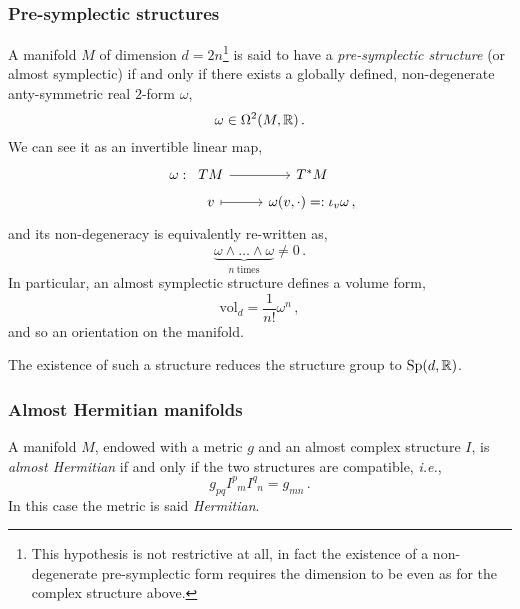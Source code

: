 \documentclass[debug]{phd}
\begin{document}
					\subsubsection{Pre-symplectic structures}
						A manifold $M$ of dimension $d = 2n$\footnote{%
							This hypothesis is not restrictive at all, in fact the existence of a non-degenerate pre-symplectic form requires the dimension to be even as for the complex structure above.%
								}
						is said to have a \emph{pre-symplectic structure} (or almost symplectic) if and only if there exists a globally defined, non-degenerate anty-symmetric real $2$-form $\omega$,
								\begin{equation}
									\omega \in \Omega^2 (M, \mathbb{R})\, .
								\end{equation}
						We can see it as an invertible linear map,
								\begin{equation}
									\begin{tikzcd}[row sep=tiny]
										\omega :\!\!\!\!\!\!\!\!\!\!\!\!\!\!\!\!\! & TM \arrow{r} & T^*M \\
 											& v \arrow[mapsto]{r} & \omega(v, \cdot) =: \iota_v \omega \, ,
									\end{tikzcd}
								\end{equation}
						and its non-degeneracy is equivalently re-written as,
								\begin{equation}
									\underbrace{\omega \wedge \ldots \wedge \omega}_{n\ \text{times}} \neq 0\, .
								\end{equation}
						In particular, an almost symplectic structure defines a volume form,
								\begin{equation}
									\mathrm{vol}_d = \frac{1}{n!} \omega^n\, ,
								\end{equation}
						and so an orientation on the manifold.
						
						The existence of such a structure reduces the structure group to $\mathrm{Sp}(d,\mathbb{R})$.
					\subsubsection{Almost Hermitian manifolds}\label{almHermstruct}
						A manifold $M$, endowed with a metric $g$ and an almost complex structure $I$, is \emph{almost Hermitian} if and only if the two structures are compatible, \emph{i.e.},
								\begin{equation}\label{hermetr}
									g_{pq} I^{p}_{\phantom{p}m} I^{q}_{\phantom{q}n} = g_{mn}\, .
								\end{equation}
						In this case the metric is said \emph{Hermitian}.
						
\end{document}
